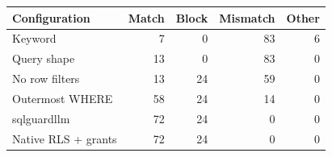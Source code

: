 \begin{tabular}{lrrrr}
\toprule
Configuration & Match & Block & Mismatch & Other \\
\midrule
Keyword & 7 & 0 & 83 & 6 \\
Query shape & 13 & 0 & 83 & 0 \\
No row filters & 13 & 24 & 59 & 0 \\
Outermost WHERE & 58 & 24 & 14 & 0 \\
sqlguardllm & 72 & 24 & 0 & 0 \\
Native RLS + grants & 72 & 24 & 0 & 0 \\
\bottomrule
\end{tabular}
